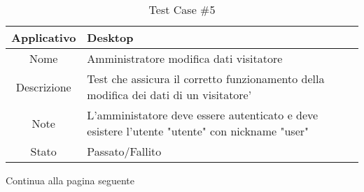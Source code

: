 
\begin{table}[H]
    \centering
    \footnotesize
    \caption{Test Case \#5}
    \begin{tabularx}{\textwidth}{|c|X|}
        \hline
        Applicativo & Desktop\\
        \hline
        Nome & Amministratore modifica dati visitatore  \\
        \hline
        Descrizione & Test che assicura il corretto funzionamento della modifica dei dati di un visitatore'\\
        \hline
        Note & L'amministatore deve essere autenticato e deve esistere l'utente "utente" con nickname "user"  \\
        \hline
        Stato & Passato/Fallito\\
        \hline

    \end{tabularx}
    Continua alla pagina seguente
    \setlength{\tabcolsep}{8pt}
    \renewcommand{\arraystretch}{1.5}
\end{table}

